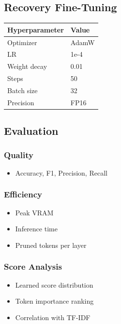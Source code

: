 {\subsection{Recovery Fine-Tuning}

\begin{table}[H]
\centering
\small
\begin{tabular}{ll}
\toprule
\textbf{Hyperparameter} & \textbf{Value} \\
\midrule
Optimizer & AdamW \\
LR & 1e-4 \\
Weight decay & 0.01 \\
Steps & 50 \\
Batch size & 32 \\
Precision & FP16 \\
\bottomrule
\end{tabular}
\end{table}

\subsection{Evaluation}

\subsubsection{Quality}
\begin{itemize}
\item Accuracy, F1, Precision, Recall

\end{itemize}
\subsubsection{Efficiency}
\begin{itemize}
\item Peak VRAM
\item Inference time
\item Pruned tokens per layer

\end{itemize}
\subsubsection{Score Analysis}
\begin{itemize}
\item Learned score distribution
\item Token importance ranking
\item Correlation with TF-IDF


\end{itemize}}

